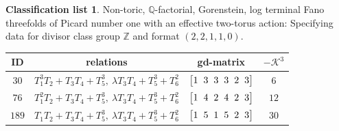 \documentclass[10pt,a4paper]{amsart}
\theoremstyle{definition}
\newtheorem{class-list}[thm]{Classification list}
\def\ZZ{{\mathbb Z}}
\def\QQ{{\mathbb Q}}
\numberwithin{equation}{section}
\begin{document}
\begin{class-list}
Non-toric, $\QQ$-factorial, Gorenstein, log terminal Fano
threefolds of Picard number one with an effective two-torus action:
Specifying data for divisor class group $\ZZ$ and format $(2,2,1,1,0)$.
\begin{table}[h!]\centering\setlength{\tabcolsep}{3.5pt}
\renewcommand{\arraystretch}{1.25}\small\tabulinesep=1mm
\begin{tabu}{c|c|c|c}
\hline
ID&relations&gd-matrix&$-\mathcal{K}^3$
\\ \hline
${30}$&${T_{1}^{3}T_{2}+T_{3}T_{4}+T_{5}^{3}},\ {\lambda T_{3}T_{4}+T_{5}^{3}+T_{6}^{2}}$
&$\arraycolsep=1mm\begin{bmatrix}{1} & {3} & {3} & {3} & {2} & {3}\end{bmatrix}$&${6}$
\\
\hline
${76}$&${T_{1}^{2}T_{2}+T_{3}T_{4}+T_{5}^{3}},\ {\lambda T_{3}T_{4}+T_{5}^{3}+T_{6}^{2}}$
&$\arraycolsep=1mm\begin{bmatrix}{1} & {4} & {2} & {4} & {2} & {3}\end{bmatrix}$&${12}$
\\ \hline
${189}$&${T_{1}T_{2}+T_{3}T_{4}+T_{5}^{3}},\ {\lambda T_{3}T_{4}+T_{5}^{3}+T_{6}^{2}}$
&$\arraycolsep=1mm\begin{bmatrix}{1} & {5} & {1} & {5} & {2} & {3}\end{bmatrix}$&${30}$
\\ \hline
\end{tabu}%
\end{table}
\end{class-list}
\end{document}
